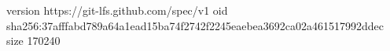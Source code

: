 version https://git-lfs.github.com/spec/v1
oid sha256:37afffabd789a64a1ead15ba74f2742f2245eaebea3692ca02a461517992ddec
size 170240
